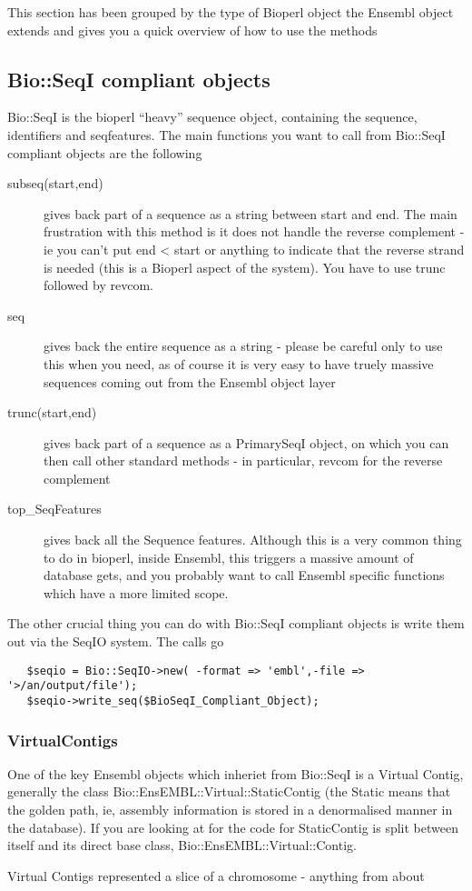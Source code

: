 \documentclass[11pt,a4paper]{article}
\begin{document}
This section has been grouped by the type of Bioperl object the Ensembl
object extends and gives you a quick overview of how to use the methods

\subsection{Bio::SeqI compliant objects}

Bio::SeqI is the bioperl ``heavy'' sequence object, containing the
sequence, identifiers and seqfeatures. The main functions you want to
call from Bio::SeqI compliant objects are the following

\begin{description}
\item[subseq(start,end)] gives back part of a sequence as a string between start and end. The main
frustration with this method is it does not handle the reverse complement - ie you can't put end < start or 
anything to indicate that the reverse strand is needed (this is a Bioperl aspect of the system). You have
to use trunc followed by revcom.
\item[seq] gives back the entire sequence as a string - please be careful only to use this when
you need, as of course it is very easy to have truely massive sequences coming out from the
Ensembl object layer
\item[trunc(start,end)] gives back part of a sequence as a PrimarySeqI object, on which you
can then call other standard methods - in particular, revcom for the reverse complement
\item[top\_SeqFeatures] gives back all the Sequence features. Although this is a very common
thing to do in bioperl, inside Ensembl, this triggers a massive amount of database gets, and you
probably want to call Ensembl specific functions which have a more limited scope.
\end{description}

The other crucial thing you can do with Bio::SeqI compliant objects is write them out
via the SeqIO system. The calls go

\begin{verbatim}
   $seqio = Bio::SeqIO->new( -format => 'embl',-file => '>/an/output/file');
   $seqio->write_seq($BioSeqI_Compliant_Object);
\end{verbatim}

\subsubsection{VirtualContigs}

One of the key Ensembl objects which inheriet from Bio::SeqI is a
Virtual Contig, generally the class
Bio::EnsEMBL::Virtual::StaticContig (the Static means that the golden
path, ie, assembly information is stored in a denormalised manner in
the database). If you are looking at for the code for StaticContig is
split between itself and its direct base class,
Bio::EnsEMBL::Virtual::Contig.

Virtual Contigs represented a slice of a chromosome - anything from about
\end{document}
